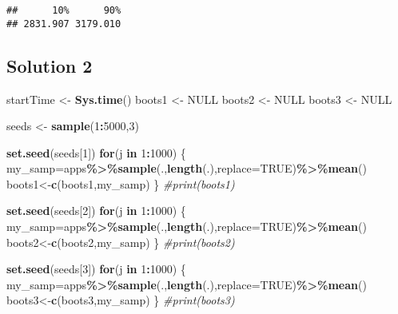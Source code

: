 \documentclass[
]{article}
\newenvironment{Shaded}{\begin{snugshade}}{\end{snugshade}}
\newcommand{\AttributeTok}[1]{\textcolor[rgb]{0.13,0.29,0.53}{#1}}
\newcommand{\CommentTok}[1]{\textcolor[rgb]{0.56,0.35,0.01}{\textit{#1}}}
\newcommand{\ConstantTok}[1]{\textcolor[rgb]{0.56,0.35,0.01}{#1}}
\newcommand{\ControlFlowTok}[1]{\textcolor[rgb]{0.13,0.29,0.53}{\textbf{#1}}}
\newcommand{\DecValTok}[1]{\textcolor[rgb]{0.00,0.00,0.81}{#1}}
\newcommand{\FunctionTok}[1]{\textcolor[rgb]{0.13,0.29,0.53}{\textbf{#1}}}
\newcommand{\NormalTok}[1]{#1}
\newcommand{\OtherTok}[1]{\textcolor[rgb]{0.56,0.35,0.01}{#1}}
\newcommand{\SpecialCharTok}[1]{\textcolor[rgb]{0.81,0.36,0.00}{\textbf{#1}}}
\begin{document}
\begin{verbatim}
##      10%      90% 
## 2831.907 3179.010
\end{verbatim}

\subsection{Solution 2}\label{solution-2}

\begin{Shaded}
\begin{Highlighting}[]
\NormalTok{startTime }\OtherTok{\textless{}{-}} \FunctionTok{Sys.time}\NormalTok{()}
\NormalTok{boots1 }\OtherTok{\textless{}{-}} \ConstantTok{NULL}
\NormalTok{boots2 }\OtherTok{\textless{}{-}} \ConstantTok{NULL}
\NormalTok{boots3 }\OtherTok{\textless{}{-}} \ConstantTok{NULL}

\NormalTok{seeds }\OtherTok{\textless{}{-}} \FunctionTok{sample}\NormalTok{(}\DecValTok{1}\SpecialCharTok{:}\DecValTok{5000}\NormalTok{,}\DecValTok{3}\NormalTok{) }

\FunctionTok{set.seed}\NormalTok{(seeds[}\DecValTok{1}\NormalTok{])}
\ControlFlowTok{for}\NormalTok{(j }\ControlFlowTok{in} \DecValTok{1}\SpecialCharTok{:}\DecValTok{1000}\NormalTok{)}
\NormalTok{\{}
\NormalTok{  my\_samp}\OtherTok{=}\NormalTok{apps}\SpecialCharTok{\%\textgreater{}\%}\FunctionTok{sample}\NormalTok{(.,}\FunctionTok{length}\NormalTok{(.),}\AttributeTok{replace=}\ConstantTok{TRUE}\NormalTok{)}\SpecialCharTok{\%\textgreater{}\%}\FunctionTok{mean}\NormalTok{()}
\NormalTok{  boots1}\OtherTok{\textless{}{-}}\FunctionTok{c}\NormalTok{(boots1,my\_samp)}
\NormalTok{\}}
\CommentTok{\#print(boots1)}

\FunctionTok{set.seed}\NormalTok{(seeds[}\DecValTok{2}\NormalTok{])}
\ControlFlowTok{for}\NormalTok{(j }\ControlFlowTok{in} \DecValTok{1}\SpecialCharTok{:}\DecValTok{1000}\NormalTok{)}
\NormalTok{\{}
\NormalTok{  my\_samp}\OtherTok{=}\NormalTok{apps}\SpecialCharTok{\%\textgreater{}\%}\FunctionTok{sample}\NormalTok{(.,}\FunctionTok{length}\NormalTok{(.),}\AttributeTok{replace=}\ConstantTok{TRUE}\NormalTok{)}\SpecialCharTok{\%\textgreater{}\%}\FunctionTok{mean}\NormalTok{()}
\NormalTok{  boots2}\OtherTok{\textless{}{-}}\FunctionTok{c}\NormalTok{(boots2,my\_samp)}
\NormalTok{\}}
\CommentTok{\#print(boots2)}

\FunctionTok{set.seed}\NormalTok{(seeds[}\DecValTok{3}\NormalTok{])}
\ControlFlowTok{for}\NormalTok{(j }\ControlFlowTok{in} \DecValTok{1}\SpecialCharTok{:}\DecValTok{1000}\NormalTok{)}
\NormalTok{\{}
\NormalTok{  my\_samp}\OtherTok{=}\NormalTok{apps}\SpecialCharTok{\%\textgreater{}\%}\FunctionTok{sample}\NormalTok{(.,}\FunctionTok{length}\NormalTok{(.),}\AttributeTok{replace=}\ConstantTok{TRUE}\NormalTok{)}\SpecialCharTok{\%\textgreater{}\%}\FunctionTok{mean}\NormalTok{()}
\NormalTok{  boots3}\OtherTok{\textless{}{-}}\FunctionTok{c}\NormalTok{(boots3,my\_samp)}
\NormalTok{\}}
\CommentTok{\#print(boots3)}



\end{Highlighting}
\end{Shaded}
\end{document}

